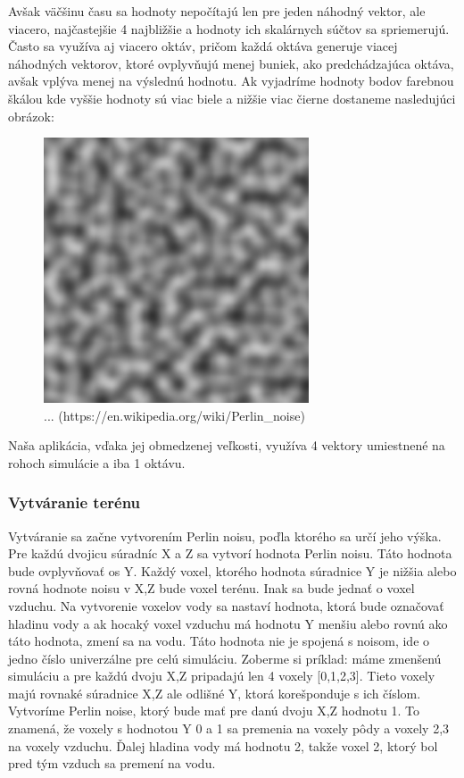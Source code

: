 \documentclass[12pt]{article}
\begin{document}
Avšak väčšinu času sa hodnoty nepočítajú len pre jeden náhodný vektor,
ale viacero, najčastejšie 4 najbližšie a hodnoty ich skalárnych súčtov
sa spriemerujú. Často sa využíva aj viacero oktáv, pričom každá oktáva generuje
viacej náhodných vektorov, ktoré ovplyvňujú menej buniek, ako predchádzajúca
oktáva, avšak vplýva menej na výslednú hodnotu. Ak vyjadríme hodnoty bodov
farebnou škálou kde vyššie hodnoty sú viac biele a nižšie viac čierne dostaneme
nasledujúci obrázok:

\begin{figure}
	\centering
	\includegraphics[width=0.7\textwidth]{res/perlinov_sum_textura.png}
	\caption{... (https://en.wikipedia.org/wiki/Perlin\_noise)}
	\label{obr:perlinov sum textura}
\end{figure}

Naša aplikácia, vďaka jej obmedzenej veľkosti, využíva 4 vektory umiestnené
na rohoch simulácie a iba 1 oktávu.

\subsubsection{Vytváranie terénu}

Vytváranie sa začne vytvorením Perlin noisu, poďla ktorého sa určí jeho výška.
Pre každú dvojicu súradníc X a Z sa vytvorí hodnota Perlin noisu. Táto hodnota
bude ovplyvňovať os Y. Každý voxel, ktorého hodnota súradnice Y je nižšia alebo
rovná hodnote noisu v X,Z bude voxel terénu. Inak sa bude jednať o voxel
vzduchu. Na vytvorenie voxelov vody sa nastaví hodnota, ktorá bude označovať
hladinu vody a ak hocaký voxel vzduchu má hodnotu Y menšiu alebo rovnú ako táto
hodnota, zmení sa na vodu. Táto hodnota nie je spojená s noisom, ide o jedno
číslo univerzálne pre celú simuláciu. Zoberme si príklad: máme zmenšenú
simuláciu a pre každú dvoju X,Z pripadajú len 4 voxely [0,1,2,3]. Tieto voxely
majú rovnaké súradnice X,Z ale odlišné Y, ktorá korešponduje s ich číslom.
Vytvoríme Perlin noise, ktorý bude mať pre danú dvoju X,Z hodnotu 1. To
znamená, že voxely s hodnotou Y 0 a 1 sa premenia na voxely pôdy a voxely 2,3
na voxely vzduchu. Ďalej hladina vody má hodnotu 2, takže voxel 2, ktorý bol
pred tým vzduch sa premení na vodu.
\end{document}
